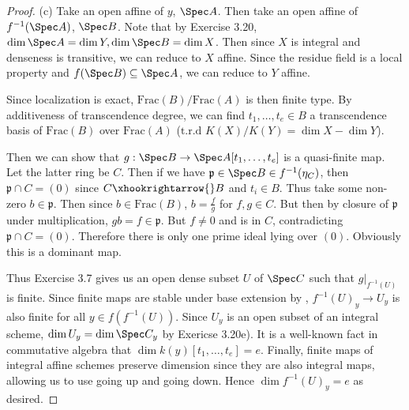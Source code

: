 \begin{proof}
	(c) Take an open affine of $y $, $\Spec A $.
	Then take an open affine of $f^{-1}(\Spec A)$, $\Spec B $.
	Note that by Exercise 3.20, $\dim \Spec A = \dim Y, \dim \Spec B = \dim X $.
	Then since $X $ is integral and denseness is transitive, we can reduce to $X $ affine.
	Since the residue field is a local property and $f(\Spec B) \subseteq \Spec A $, we can reduce to $Y $ affine.

	Since localization is exact, $\text{Frac}(B) / \text{Frac}(A) $ is then finite type.
	By additiveness of transcendence degree, we can find $t_{1}, \ldots ,t_e \in B $ a transcendence basis of $\text{Frac}(B) $ over $\text{Frac}(A) $ ($\text{t.r.d } K(X) / K(Y) = \dim X - \dim Y $).

	Then we can show that $g:\Spec B \to \Spec A[t_{1}, \ldots ,t_e] $ is a quasi-finite map.
	Let the latter ring be $C $.
	Then if we have $\mathfrak{p}\in \Spec B \in f^{-1}(\eta_C)$, then $\mathfrak{p}\cap C = (0) $ since $C \xhookrightarrow{} B$ and $t_i \in B $.
	Thus take some non-zero $b\in \mathfrak{p} $.
	Then since $b\in \text{Frac}(B) $, $b = \frac{f}{g} $ for $f,g\in C $.
	But then by closure of $\mathfrak{p}  $ under multiplication, $gb = f \in \mathfrak{p} $.
	But $f\ne 0 $ and is in $C $, contradicting $\mathfrak{p}\cap C = (0) $.
	Therefore there is only one prime ideal lying over $(0) $.
	Obviously this is a dominant map.

	Thus Exercise 3.7 gives us an open dense subset $U $ of $\Spec C $ such that $g\left.\right|_{f^{-1}(U)} $ is finite.
	Since finite maps are stable under base extension by , $f^{-1}(U)_y \to U_y $ is also finite for all $y\in f(f^{-1}(U)) $.
	Since $U_y $ is an open subset of an integral scheme, $\dim U_y = \dim \Spec C_y $ by Exericse 3.20e).
	It is a well-known fact in commutative algebra that $\dim k(y)[t_{1}, \ldots ,t_e] = e $.
	Finally, finite maps of integral affine schemes preserve dimension since they are also integral maps, allowing us to use going up and going down.
	Hence $\dim f^{-1}(U)_y = e $ as desired.


\end{proof}
